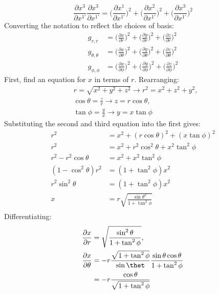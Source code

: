 \documentclass[a4paper]{article}
\begin{document}
\begin{enumerate}
\[    \frac{\partial x^3}{\partial x^{1'}} \frac{\partial x^3}{\partial x^{1'}} =
    \Bigg( \frac{\partial x^1}{\partial x^{1'}}\Bigg)^2+
    \Bigg(\frac{\partial x^2}{\partial x^{1'}}\Bigg)^2+
    \Bigg(\frac{\partial x^3}{\partial x^{1'}}\Bigg)^2
  \]
  Converting the notation to reflect the choices of basis:
  \[
    \begin{align*}
    g_{r,r} &=
    \Bigg( \frac{\partial x}{\partial r}\Bigg)^2+
    \Bigg(\frac{\partial y}{\partial r}\Bigg)^2+
    \Bigg(\frac{\partial z}{\partial r}\Bigg)^2\\
    g_{\theta,\theta} &=
    \Bigg( \frac{\partial x}{\partial \theta}\Bigg)^2+
    \Bigg(\frac{\partial y}{\partial \theta}\Bigg)^2+
    \Bigg(\frac{\partial z}{\partial \theta}\Bigg)^2\\
    g_{\phi,\phi} &=
    \Bigg( \frac{\partial x}{\partial \phi}\Bigg)^2+
    \Bigg(\frac{\partial y}{\partial \phi}\Bigg)^2+
    \Bigg(\frac{\partial z}{\partial \phi}\Bigg)^2
    \end{align*}
  \]
  First, find an equation for $x$ in terms of $r$. Rearranging:
  \[
    \begin{align*}
      &r = \sqrt{x^2 + y^2 + z^2} \to r^2= x^2+z^2+y^2,\\
      &\cos\theta = \frac{z}{r} \to z = r\cos\theta, \\
      &\tan\phi = \frac{y}{x} \to y = x\tan\phi
    \end{align*}
  \]
  Substituting the second and third equation into the first gives:
  \[
    \begin{align*}
      r^2&=x^2+(r\cos\theta)^2+(x\tan\phi)^2\\
      r^2&=x^2+r^2\cos^2\theta+x^2\tan^2\phi\\
      r^2-r^2\cos\theta&=x^2+x^2\tan^2\phi\\
      (1-\cos^2\theta)r^2&=(1+\tan^2\phi)x^2\\
      r^2\sin^2\theta &=(1+\tan^2\phi)x^2\\
      x&=r\sqrt{\frac{\sin\theta^2}{1+\tan^2\phi}}\\
    \end{align*}
  \]
  Differentiating:
  \[
    \begin{align*}
      \frac{\partial x}{\partial r} &= \sqrt{\frac{\sin^2\theta}{1+\tan^2\phi}},\\ 
      \frac{\partial x}{\partial \theta} &= 
      -r\frac{\sqrt{1+\tan^2\phi}}{\sin\thet}\frac{\sin\theta\cos\theta}{1+\tan^2\phi}\\
      &= 
      -r\frac{\cos\theta}{\sqrt{1+\tan^2\phi}}

\end{align*}\]
\end{enumerate}
\end{document}
